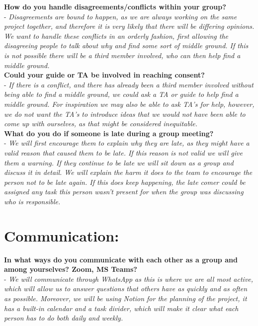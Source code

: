 \textbf{How do you handle disagreements/conflicts within your group? \\}
    - \textit{Disagreements are bound to happen, as we are always working on the same project together, and therefore it is very likely that there will be differing opinions. We want to handle these conflicts in an orderly fashion, first allowing the disagreeing people to talk about why and find some sort of middle ground. If this is not possible there will be a third member involved, who can then help find a middle ground.}\\

\textbf{Could your guide or TA be involved in reaching consent?\\}
    - \textit{If there is a conflict, and there has already been a third member involved without being able to find a middle ground, we could ask a TA or guide to help find a middle ground. For inspiration we may also be able to ask TA's for help, however, we do not want the TA's to introduce ideas that we would not have been able to come up with ourselves, as that might be considered inequitable.}\\

\textbf{What do you do if someone is late during a group meeting?\\}
    - \textit{We will first encourage them to explain why they are late, as they might have a valid reason that caused them to be late. If this reason is not valid we will give them a warning. If they continue to be late we will sit down as a group and discuss it in detail. We will explain the harm it does to the team to encourage the person not to be late again. If this does keep happening, the late comer could be assigned any task this person wasn't present for when the group was discussing who is  responsible.}\\


\section*{\textcolor{Delft_Blue}{\textbf{Communication:\vspace{5pt}}}}
\textbf{In what ways do you communicate with each other as a group and among yourselves? Zoom, MS Teams?\\}
- \textit{We will communicate through WhatsApp as this is where we are all most active, which will allow us to answer questions that others have as quickly and as often as possible. Moreover, we will be using Notion for the planning of the project, it has a built-in calendar and a task divider, which will make it clear what each person has to do both daily and weekly.}\\

